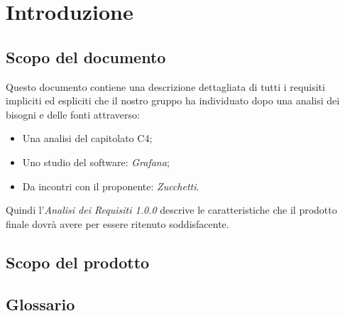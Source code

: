 \documentclass[a4]{article}
\begin{document}
	\section{Introduzione}
		\subsection{Scopo del documento}
			Questo documento contiene una descrizione dettagliata di tutti i requisiti impliciti ed espliciti che il nostro gruppo ha individuato dopo una analisi dei bisogni e delle fonti attraverso: 
				\begin{itemize}
					\item Una analisi del capitolato C4; 
					\item Uno studio del software: \textit{Grafana};
					\item Da incontri con il proponente: \textit{Zucchetti}.
				\end{itemize}
			Quindi l'\textit{Analisi dei Requisiti 1.0.0} descrive le caratteristiche che il prodotto finale dovrà avere per essere ritenuto soddisfacente.
		\subsection{Scopo del prodotto}
			
		\subsection{Glossario}
\end{document}
